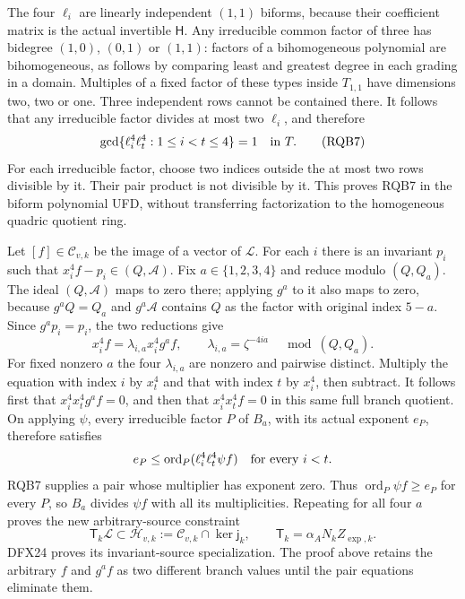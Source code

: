 \documentclass[10pt]{article}
\begin{document}
The four $\ell_i$ are linearly independent $(1,1)$ biforms,
because their coefficient matrix is the actual invertible $\mathsf H$.
Any irreducible common factor of three has bidegree $(1,0)$,
$(0,1)$ or $(1,1)$: factors of a bihomogeneous polynomial are
bihomogeneous, as follows by comparing least and greatest degree
in each grading in a domain. Multiples of a fixed factor of these
types inside $T_{1,1}$ have dimensions two, two or one.
Three independent rows cannot be contained there. It follows that
any irreducible factor divides at most two $\ell_i$, and therefore
\[
       \gcd\{\ell_i^4\ell_t^4:1\le i<t\le4\}=1
                         \quad\hbox{in }T .
 \tag{RQB7}
\]
For each irreducible factor, choose two indices outside the at most
two rows divisible by it. Their pair product is not divisible by it.
This proves RQB7 in the biform polynomial UFD, without transferring
factorization to the homogeneous quadric quotient ring.

Let $[f]\in\mathscr C_{v,k}$ be the image of a vector of $\mathscr L$.
For each $i$ there is an invariant $p_i$ such that
$x_i^4f-p_i\in(Q,\mathcal A)$.
Fix $a\in\{1,2,3,4\}$ and reduce modulo $(Q,Q_a)$.
The ideal $(Q,\mathcal A)$ maps to zero there; applying $g^a$
to it also maps to zero, because $g^aQ=Q_a$ and $g^a\mathcal A$
contains $Q$ as the factor with original index $5-a$.
Since $g^ap_i=p_i$, the two reductions give
\[
 x_i^4f=\lambda_{i,a}x_i^4g^af,\qquad
 \lambda_{i,a}=\zeta^{-4ia}\quad\bmod(Q,Q_a).
 \tag{RQB8}
\]
For fixed nonzero $a$ the four $\lambda_{i,a}$ are nonzero and
pairwise distinct. Multiply the equation with index $i$ by
$x_t^4$ and that with index $t$ by $x_i^4$, then subtract.
It follows first that $x_i^4x_t^4g^af=0$, and then that
$x_i^4x_t^4f=0$ in this same full branch quotient.
On applying $\psi$, every irreducible factor $P$ of $B_a$,
with its actual exponent $e_P$, therefore satisfies
\[
 e_P\le\operatorname{ord}_P(\ell_i^4\ell_t^4\psi f)
                  \quad\hbox{for every }i<t .
\]
RQB7 supplies a pair whose multiplier has exponent zero.
Thus $\operatorname{ord}_P\psi f\ge e_P$ for every $P$,
so $B_a$ divides $\psi f$ with all its multiplicities.
Repeating for all four $a$ proves the new arbitrary-source constraint
\[
 \mathsf T_k\mathscr L\subset
 \mathscr H_{v,k}:=\mathscr C_{v,k}\cap\ker\mathsf j_k,\qquad
 \mathsf T_k=\alpha_A N_kZ_{\exp,k}.
 \tag{RQB9}
\]
DFX24 proves its invariant-source specialization. The proof above
retains the arbitrary $f$ and $g^af$ as two different branch values
until the pair equations eliminate them.
\end{document}
